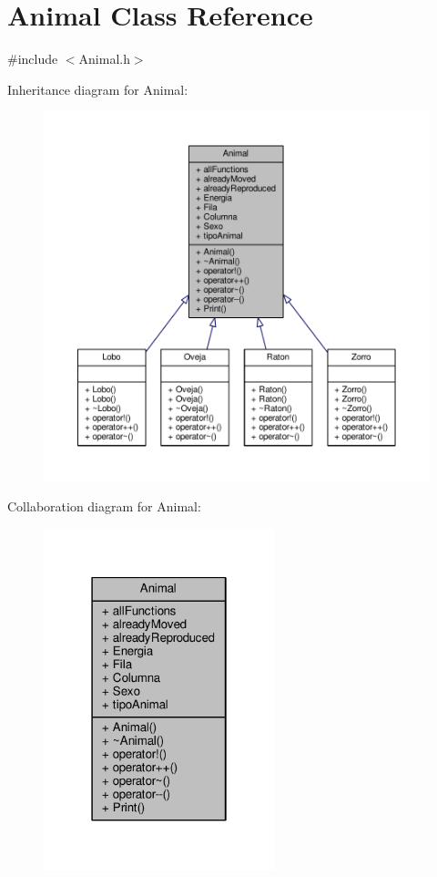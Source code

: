 \hypertarget{classAnimal}{}\section{Animal Class Reference}
\label{classAnimal}


{\ttfamily \#include $<$Animal.\+h$>$}



Inheritance diagram for Animal\+:\nopagebreak
\begin{figure}[H]
\begin{center}
\leavevmode
\includegraphics[width=350pt]{classAnimal__inherit__graph}
\end{center}
\end{figure}


Collaboration diagram for Animal\+:\nopagebreak
\begin{figure}[H]
\begin{center}
\leavevmode
\includegraphics[width=190pt]{classAnimal__coll__graph}
\end{center}
\end{figure}
